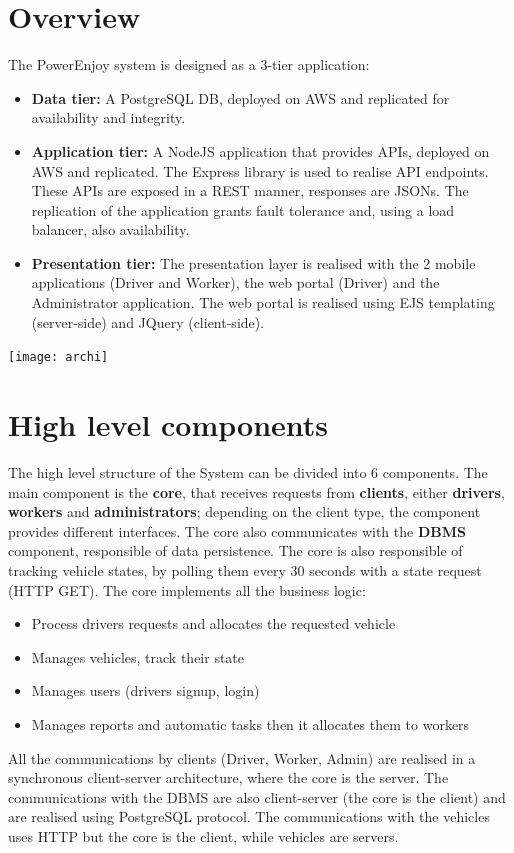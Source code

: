 \section{Overview}
The PowerEnjoy system is designed as a 3-tier application:
\begin{itemize}
\item \textbf{Data tier:} A PostgreSQL DB, deployed on AWS and replicated for availability and integrity. 
\item \textbf{Application tier:} A NodeJS application that provides APIs, deployed on AWS and replicated. The Express library is used to realise API endpoints. These APIs are exposed in a REST manner, responses are JSONs. The replication of the application grants fault tolerance and, using a load balancer, also availability.
\item \textbf{Presentation tier:} The presentation layer is realised with the 2 mobile applications (Driver and Worker), the web portal (Driver) and the Administrator application. The web portal is realised using EJS templating (server-side) and JQuery (client-side).
\end{itemize}
\texttt{[image: archi]}

\section{High level components}
The high level structure of the System can be divided into 6 components. The main component is the \textbf{core}, that receives requests from \textbf{clients}, either \textbf{drivers}, \textbf{workers} and \textbf{administrators}; depending on the client type, the component provides different interfaces. 
The core also communicates with the \textbf{DBMS} component, responsible of data persistence. 
The core is also responsible of tracking vehicle states, by polling them every 30 seconds with a state request (HTTP GET).
The core implements all the business logic: 
\begin{itemize}
\item Process drivers requests and allocates the requested vehicle 
\item Manages vehicles, track their state
\item Manages users (drivers signup, login)
\item Manages reports and automatic tasks then it allocates them to workers
\end{itemize}
All the communications by clients (Driver, Worker, Admin) are realised in a synchronous client-server architecture, where the core is the server. The communications with the DBMS are also client-server (the core is the client) and are realised using PostgreSQL protocol. The communications with the vehicles uses HTTP but the core is the client, while vehicles are servers.


